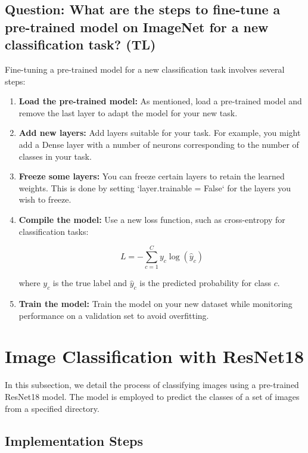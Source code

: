 \documentclass{article}
\begin{document}
\subsection{Question: What are the steps to fine-tune a pre-trained model on ImageNet for a new classification task? (TL)}

\justify
Fine-tuning a pre-trained model for a new classification task involves several steps:

\begin{enumerate}
    \item \textbf{Load the pre-trained model:} As mentioned, load a pre-trained model and remove the last layer to adapt the model for your new task.
    
    \item \textbf{Add new layers:} Add layers suitable for your task. For example, you might add a Dense layer with a number of neurons corresponding to the number of classes in your task.
    
    \item \textbf{Freeze some layers:} You can freeze certain layers to retain the learned weights. This is done by setting `layer.trainable = False` for the layers you wish to freeze.
    
    \item \textbf{Compile the model:} Use a new loss function, such as cross-entropy for classification tasks:

    \[
    L = - \sum_{c=1}^C y_c \log(\hat{y}_c)
    \]

    where \( y_c \) is the true label and \( \hat{y}_c \) is the predicted probability for class \( c \).
    
    \item \textbf{Train the model:} Train the model on your new dataset while monitoring performance on a validation set to avoid overfitting.
\end{enumerate}


\section{Image Classification with ResNet18}

In this subsection, we detail the process of classifying images using a pre-trained ResNet18 model. The model is employed to predict the classes of a set of images from a specified directory.

\subsection{Implementation Steps}
\end{document}
